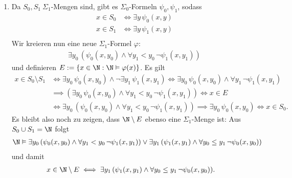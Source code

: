 \begin{solution}
	\phantom{}
	
	\begin{enumerate}[label = \alph*.]
		\item Da $S_0,S_1 \ \Sigma_1$-Mengen sind, gibt es $\Sigma_0$-Formeln $\psi_0,\psi_1$, sodass
		\begin{align*}
		x \in S_0 &\iff \exists y\, \psi_0(x,y) \\
		x \in S_1 &\iff \exists y\, \psi_1(x,y) \\
		\end{align*}
		Wir kreieren nun eine neue $\Sigma_1$-Formel $\varphi$:
		\begin{align*}
		\exists y_0\, (\psi_0(x,y_0) \land \forall y_1 < y_0\, \neg \psi_1(x,y_1))
		\end{align*}
		und definieren $E := \{x \in \N: \N \vDash \varphi(x)\}$.
		Es gilt
		\begin{align*}
		x \in S_0 \setminus S_1 &\iff \exists y_0\, \psi_0(x,y_0) \land
		\neg \exists y_1\, \psi_1(x,y_1) \iff
		\exists y_0\, \psi_0(x,y_0) \land
		\forall y_1\, \neg \psi_1(x,y_1) \\
		&\implies (\exists y_0\, \psi_0(x,y_0) \land
		\forall y_1 < y_0\, \neg \psi_1(x,y_1)) \iff x \in E \\
		&\iff \exists y_0\, (\psi_0(x,y_0) \land \forall y_1 < y_0\, \neg \psi_1(x,y_1))
		\implies \exists y_0\, \psi_0(x,y_0) \iff x \in S_0.
		\end{align*}
		Es bleibt also noch zu zeigen, dass $\N \setminus E$ ebenso eine $\Sigma_1$-Menge ist:
		Aus $S_0 \cup S_1 = \N$ folgt
		\begin{align*}
		\N \vDash \exists y_0\, (\psi_0(x,y_0) \land \forall y_1 < y_0\, \neg \psi_1(x,y_1))
		\lor \exists y_1\, (\psi_1(x,y_1) \land \forall y_0 \leq y_1\, \neg \psi_0(x,y_0))
		\end{align*}
		und damit
		\begin{align*}
		x \in \N \setminus E &\iff \exists y_1\, (\psi_1(x,y_1) \land \forall y_0 \leq y_1\, \neg \psi_0(x,y_0)).
		\end{align*}
		

\end{enumerate}
\end{solution}
